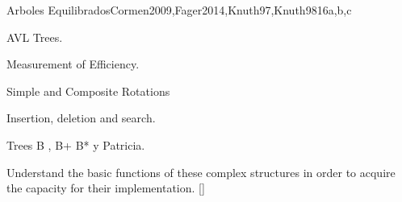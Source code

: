 \begin{syllabus}
\begin{unit}{Arboles Equilibrados}{}{Cormen2009,Fager2014,Knuth97,Knuth98}{16}{a,b,c}
   \begin{topics}
        \item AVL Trees.
	\item Measurement of Efficiency.
	\item Simple and Composite Rotations
	\item Insertion, deletion and search.
	\item Trees B , B+ B* y Patricia.
   \end{topics}

   \begin{learningoutcomes}
      \item Understand the basic functions of these complex structures in order to acquire the capacity for their implementation. [\Assessment]
   \end{learningoutcomes}
\end{unit}

\begin{coursebibliography}
\end{coursebibliography}

\end{syllabus}
